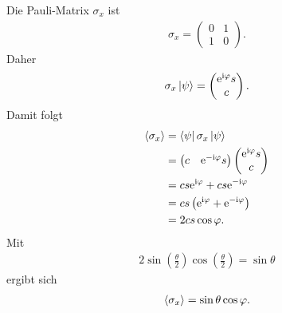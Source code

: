 \documentclass[11pt,a4paper]{scrartcl}
\newcommand{\e}{\mathrm e}
\newcommand{\ii}{\mathrm i}
\begin{document}
\begin{enumerate}[label=(\alph*)]
\begin{calculationbox}
            \begin{calculationbox}[title=Erwartungswert von $\sigma_x$]
                Die Pauli-Matrix $\sigma_x$ ist
                \begin{align*}
                    \sigma_x=
                    \begin{pmatrix}
                        0&1\\
                        1&0
                    \end{pmatrix}.
                \end{align*}
                Daher
                \begin{align*}
                    \sigma_x\ket{\psi}
                    =
                    \begin{pmatrix}
                        \e^{\ii\varphi}s\\
                        c
                    \end{pmatrix}.
                \end{align*}
                Damit folgt
                \begin{align*}
                    \braket{\sigma_x}
                    &=
                    \bra{\psi}\sigma_x\ket{\psi}\\
                    &=
                    \begin{pmatrix}
                        c & \e^{-\ii\varphi}s
                    \end{pmatrix}
                    \begin{pmatrix}
                        \e^{\ii\varphi}s\\
                        c
                    \end{pmatrix}\\
                    &=
                    cs\e^{\ii\varphi}
                    +
                    cs\e^{-\ii\varphi}\\
                    &=
                    cs\left(\e^{\ii\varphi}+\e^{-\ii\varphi}\right)\\
                    &=
                    2cs\cos\varphi.
                \end{align*}
                Mit
                \begin{align*}
                    2\sin\left(\frac{\theta}{2}\right)\cos\left(\frac{\theta}{2}\right)
                    =
                    \sin\theta
                \end{align*}
                ergibt sich
                \begin{align*}
                    \braket{\sigma_x}
                    =
                    \sin\theta\cos\varphi.
                \end{align*}
            \end{calculationbox}


\end{calculationbox}
\end{enumerate}
\end{document}
